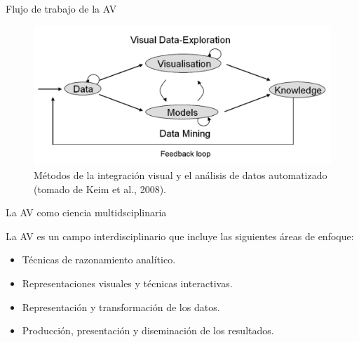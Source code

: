 \documentclass[aspectratio=169,xcolor=dvipsnames]{beamer}
\begin{document}
\begin{frame}{Flujo de trabajo de la AV}

\begin{figure}[h]
\centering
\includegraphics[scale=0.25]{feedback_loop_keim_2008.png}
\caption{Métodos de la integración visual y el análisis de datos automatizado (tomado de Keim et al., 2008).}
\end{figure}
    
\end{frame}

\begin{frame}{La AV como ciencia multidsciplinaria}

La AV es un campo interdisciplinario que incluye las siguientes áreas de enfoque:

    \begin{itemize} %
        \item Técnicas de razonamiento analítico.
        \item Representaciones visuales y técnicas interactivas.
        \item Representación y transformación de los datos.
        \item Producción, presentación y diseminación de los resultados.
    \end{itemize}
\end{frame}

\end{document}
